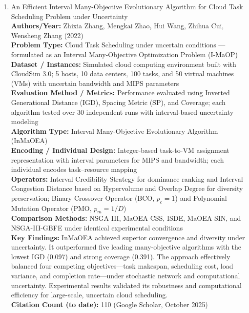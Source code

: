 \documentclass[a4paper,12pt]{article}
\begin{document}
\begin{enumerate}[leftmargin=2em, labelwidth=1em, labelsep=0.5em, itemsep=1ex]
  \item An Efficient Interval Many-Objective Evolutionary Algorithm for Cloud Task Scheduling Problem under Uncertainty \\
    \textbf{Authors/Year:} Zhixia Zhang, Mengkai Zhao, Hui Wang, Zhihua Cui, Wensheng Zhang (2022) \\  
    \textbf{Problem Type:} Cloud Task Scheduling under uncertain conditions — formulated as an Interval Many-Objective Optimization Problem (I-MaOP) \\  
    \textbf{Dataset / Instances:} Simulated cloud computing environment built with CloudSim 3.0; 5 hosts, 10 data centers, 100 tasks, and 50 virtual machines (VMs) with uncertain bandwidth and MIPS parameters \\  
    \textbf{Evaluation Method / Metrics:} Performance evaluated using Inverted Generational Distance (IGD), Spacing Metric (SP), and Coverage; each algorithm tested over 30 independent runs with interval-based uncertainty modeling \\  
    \textbf{Algorithm Type:} Interval Many-Objective Evolutionary Algorithm (InMaOEA) \\  
    \textbf{Encoding / Individual Design:} Integer-based task-to-VM assignment representation with interval parameters for MIPS and bandwidth; each individual encodes task–resource mapping \\  
    \textbf{Operators:} Interval Credibility Strategy for dominance ranking and Interval Congestion Distance based on Hypervolume and Overlap Degree for diversity preservation; Binary Crossover Operator (BCO, $p_c = 1$) and Polynomial Mutation Operator (PMO, $p_m = 1/D$) \\  
    \textbf{Comparison Methods:} NSGA-III, MaOEA-CSS, ISDE, MaOEA-SIN, and NSGA-III-GBFE under identical experimental conditions \\  
    \textbf{Key Findings:} InMaOEA achieved superior convergence and diversity under uncertainty. It outperformed five leading many-objective algorithms with the lowest IGD (0.097) and strong coverage (0.391). The approach effectively balanced four competing objectives—task makespan, scheduling cost, load variance, and completion rate—under stochastic network and computational uncertainty. Experimental results validated its robustness and computational efficiency for large-scale, uncertain cloud scheduling. \\  
    \textbf{Citation Count (to date):} 110 (Google Scholar, October 2025) \\[2ex]
  

\end{enumerate}
\end{document}
